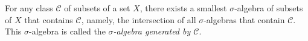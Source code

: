 For any class $\mathcal{C}$ of subsets of a set $X$, there exists a smallest $\sigma$-algebra of subsets of $X$ that contains $\mathcal{C}$, namely, the intersection of all $\sigma$-algebras that contain $\mathcal{C}$. This $\sigma$-algebra is called the \textit{$\sigma$-algebra generated by $\mathcal{C}$}.
